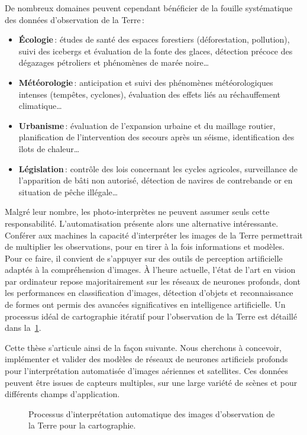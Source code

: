 De nombreux domaines peuvent cependant bénéficier de la fouille systématique des données d'observation de la Terre\,:
\begin{itemize}
	\item \textbf{Écologie}\,: études de santé des espaces forestiers (déforestation, pollution), suivi des icebergs et évaluation de la fonte des glaces, détection précoce des dégazages pétroliers et phénomènes de marée noire\dots
	\item \textbf{Météorologie}\,: anticipation et suivi des phénomènes météorologiques intenses (tempêtes, cyclones), évaluation des effets liés au réchauffement climatique\dots
	\item \textbf{Urbanisme}\,: évaluation de l'expansion urbaine et du maillage routier, planification de l'intervention des secours après un séisme, identification des îlots de chaleur\dots
	\item \textbf{Législation}\,: contrôle des lois concernant les cycles agricoles, surveillance de l'apparition de bâti non autorisé, détection de navires de contrebande or en situation de pêche illégale\dots
\end{itemize}

Malgré leur nombre, les photo-interprètes ne peuvent assumer seuls cette responsabilité. L'automatisation présente alors une alternative intéressante. Conférer aux machines la capacité d'interpréter les images de la Terre permettrait de multiplier les observations, pour en tirer à la fois informations et modèles. Pour ce faire, il convient de s'appuyer sur des outils de perception artificielle adaptés à la compréhension d'images. À l'heure actuelle, l'état de l'art en vision par ordinateur repose majoritairement sur les réseaux de neurones profonds, dont les performances en classification d'images, détection d'objets et reconnaissance de formes ont permis des avancées significatives en intelligence artificielle. Un processus idéal de cartographie itératif pour l'observation de la Terre est détaillé dans la~\cref{fig:workflow}.

Cette thèse s'articule ainsi de la façon suivante. Nous cherchons à concevoir, implémenter et valider des modèles de réseaux de neurones artificiels profonds pour l'interprétation automatisée d'images aériennes et satellites. Ces données peuvent être issues de capteurs multiples, sur une large variété de scènes et pour différents champs d'application.

\begin{figure}[h]
    \centering
    \def\svgwidth{\columnwidth}
    
		\caption{Processus d'interprétation automatique des images d'observation de la Terre pour la cartographie.}
		\label{fig:workflow}
\end{figure}

